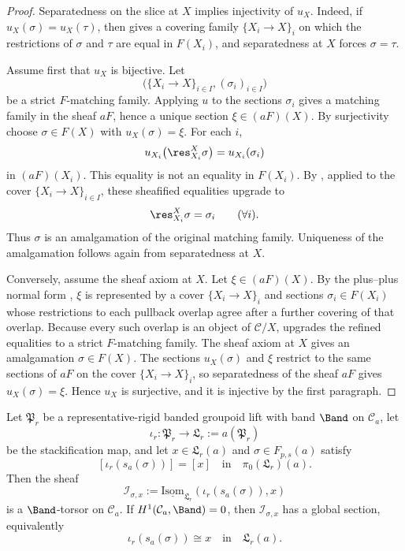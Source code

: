 \begin{proof}
Separatedness on the slice at \(X\) implies injectivity of \(u_X\). Indeed, if
\(u_X(\sigma)=u_X(\tau)\), then
 gives a covering family
\(\{X_i\to X\}_i\) on which the restrictions of \(\sigma\) and \(\tau\)
are equal in \(F(X_i)\), and separatedness at \(X\) forces
\(\sigma=\tau\).

Assume first that \(u_X\) is bijective. Let
\[
\bigl(\{X_i\to X\}_{i\in I},(\sigma_i)_{i\in I}\bigr)
\]
be a strict \(F\)-matching family. Applying \(u\) to the sections
\(\sigma_i\) gives a matching family in the sheaf \(aF\), hence a unique
section \(\xi\in(aF)(X)\). By surjectivity choose
\(\sigma\in F(X)\) with \(u_X(\sigma)=\xi\). For each \(i\),
\[
u_{X_i}\bigl(\res_{X_i}^{X}\sigma\bigr)=u_{X_i}(\sigma_i)
\]
in \((aF)(X_i)\). This equality is not an equality in \(F(X_i)\). By
, applied to the cover
\(\{X_i\to X\}_{i\in I}\), these sheafified equalities upgrade to
\[
\res_{X_i}^{X}\sigma=\sigma_i
\qquad(\forall i).
\]
Thus \(\sigma\) is an amalgamation of the original matching family.
Uniqueness of the amalgamation follows again from separatedness at \(X\).

Conversely, assume the sheaf axiom at \(X\). Let
\(\xi\in(aF)(X)\). By the plus--plus normal form
, \(\xi\) is represented
by a cover \(\{X_i\to X\}_i\) and sections
\(\sigma_i\in F(X_i)\) whose restrictions to each pullback overlap agree
after a further covering of that overlap. Because every such overlap is an
object of \(\mathcal C/X\), 
upgrades the refined equalities to a strict \(F\)-matching family. The
sheaf axiom at \(X\) gives an amalgamation \(\sigma\in F(X)\). The
sections \(u_X(\sigma)\) and \(\xi\) restrict to the same sections of
\(aF\) on the cover \(\{X_i\to X\}_i\), so separatedness of the sheaf
\(aF\) gives \(u_X(\sigma)=\xi\). Hence \(u_X\) is surjective, and it is
injective by the first paragraph.
\end{proof}

\begin{lemma}\label{lem:canonical-lift-isom-torsor}
Let $\mathfrak P_r$ be a representative-rigid banded groupoid lift with band $\Band$ on $\mathcal C_a$, let
\[
\iota_r:\mathfrak P_r\to\mathfrak L_r:=a(\mathfrak P_r)
\]
be the stackification map, and let $x\in\mathfrak L_r(a)$ and $\sigma\in F_{p,s}(a)$ satisfy
\[
[\iota_r(s_a(\sigma))]=[x]
\quad\text{in}\quad
\pi_0(\mathfrak L_r)(a).
\]
Then the sheaf
\[
\mathcal I_{\sigma,x}:=
\underline{\mathrm{Isom}}_{\mathfrak L_r}(\iota_r(s_a(\sigma)),x)
\]
is a $\Band$-torsor on $\mathcal C_a$. If $H^1(\mathcal C_a,\Band)=0$, then $\mathcal I_{\sigma,x}$ has a global section, equivalently
\[
\iota_r(s_a(\sigma))\cong x
\quad\text{in}\quad
\mathfrak L_r(a).
\]
\end{lemma}

